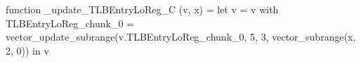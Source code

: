 function _update_TLBEntryLoReg_C (v, x) = let v = { v with TLBEntryLoReg_chunk_0 = vector_update_subrange(v.TLBEntryLoReg_chunk_0, 5, 3, vector_subrange(x, 2, 0)) } in v

